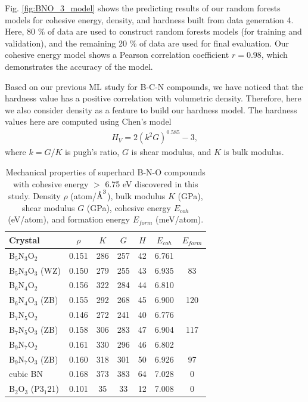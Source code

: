     Fig. \ref{fig:BNO_3_model} shows the predicting results of our random forests models for cohesive energy, density, and hardness built from data generation 4. Here, 80 \% of data are used to construct random forests models (for training and validation), and the remaining 20 \% of data are used for final evaluation. Our cohesive energy model shows a Pearson correlation coefficient $r = 0.98$, which demonstrates the accuracy of the model. 

    Based on our previous ML study for B-C-N compounds, we have noticed that the hardness value has a positive correlation with volumetric density. Therefore, here we also consider density as a feature to build our hardness model. The hardness values here are computed using Chen's model \cite{chen2011modeling}
	\begin{equation}
		\label{eq:Chen}
		\begin{aligned}
			H_V = 2(k^2G)^{0.585}-3,
		\end{aligned}
	\end{equation}
	where $k = G/K$ is pugh's ratio, $G$ is shear modulus, and $K$ is bulk modulus.

	\begin{table}[t]
		\begin{center}
		\caption[Mechanical properties of newly-found superhard B-N-O compounds]{Mechanical properties of superhard B-N-O compounds with cohesive energy $>$ 6.75 eV discovered in this study. Density $\rho$ (atom/$\text{\normalfont\AA}^3$), bulk modulus $K$ (GPa), shear modulus $G$ (GPa), cohesive energy $E_{coh}$ (eV/atom), and formation energy $E_{form}$ (meV/atom).}
		\label{tab:BNO}
		\begin{tabular}{l|c|c|c|c|c|c} %
			Crystal   & $\rho$ & $K$ & $G$ & $H$ & $ E_{coh}$ & $E_{form}$ \\
			\hline
			B$_5$N$_3$O$_2$      & 0.151 & 286  & 257  & 42 & 6.761 & \\
			B$_5$N$_3$O$_3$ (WZ) & 0.150 & 279  & 255  & 43 & 6.935 & 83 \\
			B$_6$N$_4$O$_2$      & 0.156 & 322  & 284  & 44 & 6.810 & \\
			B$_6$N$_4$O$_3$ (ZB) & 0.155 & 292  & 268  & 45 & 6.900 & 120 \\
			B$_7$N$_5$O$_2$      & 0.146 & 272  & 241  & 40 & 6.776 & \\
			B$_7$N$_5$O$_3$ (ZB) & 0.158 & 306  & 283  & 47 & 6.904 & 117 \\
			B$_9$N$_7$O$_2$      & 0.161 & 330  & 296  & 46 & 6.802 & \\
			B$_9$N$_7$O$_3$ (ZB) & 0.160 & 318  & 301  & 50 & 6.926 & 97 \\
			cubic BN             & 0.168 & 373  & 383  & 64 & 7.028 & 0 \\
			B$_2$O$_3$ (P3$_1$21)& 0.101 &   35 & 33   & 12 & 7.008 & 0
		\end{tabular}
		\end{center}
	\end{table}    



